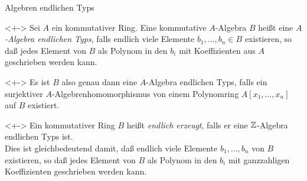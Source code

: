 \begin{frame}{Algebren endlichen Typs}
	\begin{definition}<+->
		Sei \(A\) ein kommutativer Ring. Eine kommutative \(A\)-Algebra \(B\) heißt eine \emph{\(A\)-Algebra endlichen Typs},
		falls endlich viele Elemente \(b_1, \dotsc, b_n \in B\) existieren, so daß jedes Element von \(B\) als Polynom
		in den \(b_i\) mit Koeffizienten aus \(A\) geschrieben werden kann.
	\end{definition}
	\begin{visibleenv}<+->
		Es ist \(B\) also genau dann eine \(A\)-Algebra endlichen Typs, falls ein surjektiver \(A\)-Algebrenhomomorphismus von
		einem Polynomring \(A[x_1, \dotsc, x_n]\) auf \(B\) existiert.
	\end{visibleenv}
	\begin{example}<+->
		Ein kommutativer Ring \(B\) heißt \emph{endlich erzeugt}, falls er eine \(\mathbb Z\)-Algebra endlichen Typs ist.
		\\
		Dies ist gleichbedeutend damit, daß endlich viele Elemente \(b_1, \dotsc, b_n\) von \(B\) existieren, so daß jedes
		Element von \(B\) als Polynom in den \(b_i\) mit ganzzahligen Koeffizienten geschrieben werden kann.
	\end{example}
\end{frame}

